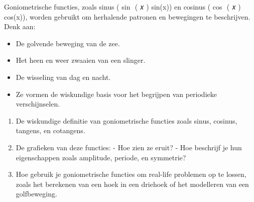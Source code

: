 \documentclass{ximera}
\begin{document}

Goniometrische functies, zoals sinus (
sin
⁡
(
𝑥
)
sin(x)) en cosinus (
cos
⁡
(
𝑥
)
cos(x)), worden gebruikt om herhalende patronen en bewegingen te beschrijven. Denk aan:
\begin{itemize}
    \item De golvende beweging van de zee.
    \item Het heen en weer zwaaien van een slinger.
    \item De wisseling van dag en nacht.
    \item Ze vormen de wiskundige basis voor het begrijpen van periodieke verschijnselen.
\end{itemize}

\begin{template}
    \begin{enumerate}
        \item De wiskundige definitie van goniometrische functies zoals sinus, cosinus, tangens, en cotangens.
        \item De grafieken van deze functies:
        - Hoe zien ze eruit?
        - Hoe beschrijf je hun eigenschappen zoals amplitude, periode, en symmetrie?
        \item Hoe gebruik je goniometrische functies om real-life problemen op te lossen, zoals het berekenen van een hoek in een driehoek of het modelleren van een golfbeweging.   
    \end{enumerate}
 
\end{template}
\end{document}
